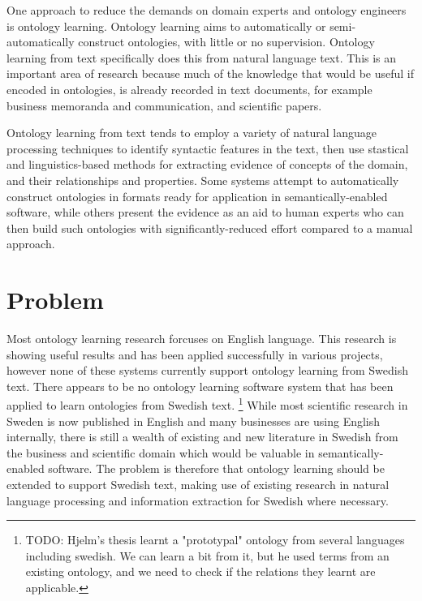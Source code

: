 \documentclass[a4paper]{report}
\newcommand{\todo}[1]{\footnote{{\color{red} TODO: #1}}}
\begin{document}
One approach to reduce the demands on domain experts and ontology engineers is ontology learning.
Ontology learning aims to automatically or semi-automatically construct ontologies, with little or no supervision.
Ontology learning from text specifically does this from natural language text.
This is an important area of research because much of the knowledge that would be useful if encoded in ontologies, is already recorded in text documents, for example business memoranda and communication, and scientific papers.

Ontology learning from text tends to employ a variety of natural language processing techniques to identify syntactic features in the text, then use stastical and linguistics-based methods for extracting evidence of concepts of the domain, and their relationships and properties.
Some systems attempt to automatically construct ontologies in formats ready for application in semantically-enabled software, while others present the evidence as an aid to human experts who can then build such ontologies with significantly-reduced effort compared to a manual approach.

\section{Problem}
\label{sec:intro:problem}

Most ontology learning research forcuses on English language.
This research is showing useful results and has been applied successfully in various projects, however none of these systems currently support ontology learning from Swedish text.
There appears to be no ontology learning software system that has been applied to learn ontologies from Swedish text.
\todo{Hjelm's thesis\cite{Hjelm09Thesis} learnt a "prototypal" ontology from several languages including swedish.
We can learn a bit from it, but he used terms from an existing ontology, and we need to check if the relations they learnt are applicable.}
While most scientific research in Sweden is now published in English and many businesses are using English internally, there is still a wealth of existing and new literature in Swedish from the business and scientific domain which would be valuable in semantically-enabled software.
The problem is therefore that ontology learning should be extended to support Swedish text, making use of existing research in natural language processing and information extraction for Swedish where necessary.
 
\end{document}
